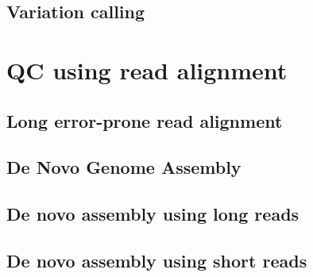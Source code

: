 \subsection{Variation calling} 

\section{QC using read alignment} 
\subsection{Long error-prone read alignment}  
\subsection{De Novo Genome Assembly} 
\subsection{De novo assembly using long reads} 
\subsection{De novo assembly using short reads} 


